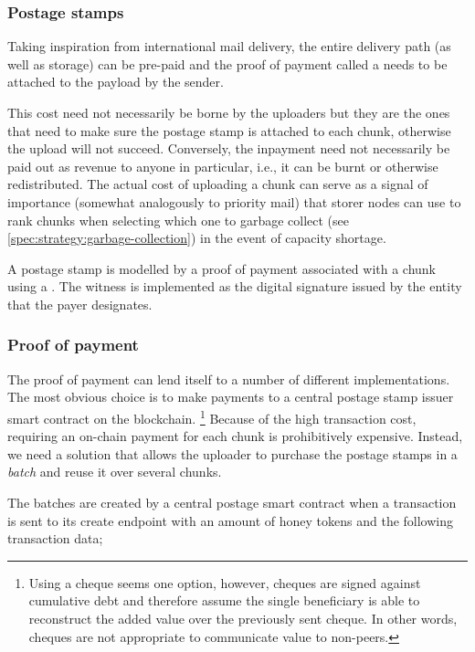 \subsubsection{Postage stamps}

Taking inspiration from international mail delivery, the entire delivery path (as well as storage) can be pre-paid and the proof of payment called a  needs to be attached to the payload by the sender.

This cost need not necessarily be borne by the uploaders but they are the ones that need to make sure the postage stamp is attached to each chunk,  otherwise the upload will not succeed. Conversely, the inpayment need not necessarily be paid out as revenue to anyone in particular, i.e., it can be burnt or otherwise redistributed. The actual cost of uploading a chunk can serve as a signal of importance (somewhat analogously to priority mail) that storer nodes can use to rank chunks when selecting which one to garbage collect (see \ref{spec:strategy:garbage-collection}) in the event of capacity shortage.

A postage stamp is modelled by a proof of payment associated with a chunk using a . The witness is implemented as the digital signature issued by the entity that the payer designates.


\subsubsection{Proof of payment}

The proof of payment can lend itself to a number of different implementations. The most obvious choice is to make payments to a central postage stamp issuer smart contract on the blockchain.%
%
\footnote{Using a cheque seems one option, however, cheques are  signed against cumulative debt and therefore assume the single beneficiary is able to reconstruct the added value over the previously sent cheque. In other words, cheques are not appropriate to communicate value to non-peers.}
%
Because of the high transaction cost, requiring an on-chain payment for each chunk is prohibitively expensive. Instead, we need a solution that allows the uploader to purchase the postage stamps in a \emph{batch} and reuse it over several chunks. 


The batches are created by a central postage smart contract when a transaction is sent to its create endpoint with an amount of honey tokens and the following transaction data;

